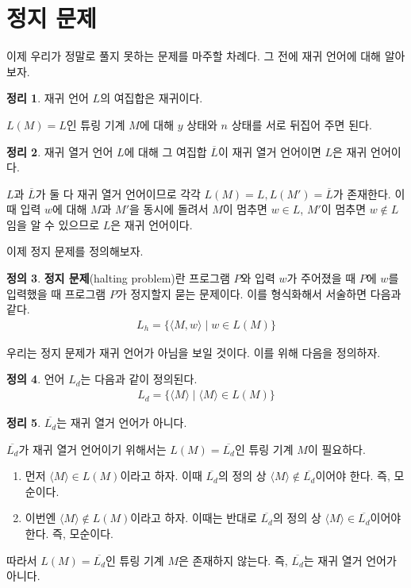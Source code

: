 \documentclass[b5paper, 11pt]{book}
\theoremstyle{definition}
\newtheorem{defn}{정의}[chapter]
\newtheorem{thm}[defn]{정리}
\newenvironment{pf*}{\pushQED{\qed}\pf}
{\popQED\endpf}
\begin{document}
\section{정지 문제}
이제 우리가 정말로 풀지 못하는 문제를 마주할 차례다. 그 전에 재귀 언어에 대해 알아보자.
\begin{thm}
    재귀 언어 $L$의 여집합은 재귀이다.
\end{thm}
\begin{pf*}
    $L(M) = L$인 튜링 기계 $M$에 대해 $y$ 상태와 $n$ 상태를 서로 뒤집어 주면 된다.
\end{pf*}
\begin{thm}
    재귀 열거 언어 $L$에 대해 그 여집합 $\overline{L}$이 재귀 열거 언어이면 $L$은 재귀 언어이다.
\end{thm}
\begin{pf*}
    $L$과 $\overline{L}$가 둘 다 재귀 열거 언어이므로 각각 $L(M) = L, L(M') = \overline{L}$가 존재한다. 이때 입력 $w$에
    대해 $M$과 $M'$을 동시에 돌려서 $M$이 멈추면 $w \in L$, $M'$이 멈추면 $w \notin L$임을 알 수 있으므로
    $L$은 재귀 언어이다. 
\end{pf*}
이제 정지 문제를 정의해보자. 
\begin{defn}
    \textbf{정지 문제}(halting problem)란 프로그램 $P$와 입력 $w$가 주어졌을 때 $P$에 $w$를 입력했을
    때 프로그램 $P$가 정지할지 묻는 문제이다. 이를 형식화해서 서술하면 다음과 같다.
    \begin{align*}
        L_h = \{ \langle M, w \rangle \;\vert\; w \in L(M) \}
    \end{align*}
\end{defn}
우리는 정지 문제가 재귀 언어가 아님을 보일 것이다. 이를 위해 다음을 정의하자.
\begin{defn}
    언어 $L_d$는 다음과 같이 정의된다.
    \begin{align*}
        L_d = \{ \langle M \rangle \;\vert\; \langle M \rangle \in L(M) \}
    \end{align*}
\end{defn}
\begin{thm}\label{Ldc not re}
    $\overline{L_d}$는 재귀 열거 언어가 아니다. 
\end{thm}
\begin{pf*}
    $\overline{L_d}$가 재귀 열거 언어이기 위해서는 $L(M) = \overline{L_d}$인 튜링 기계 $M$이 필요하다.
    \begin{enumerate}
        \item  먼저 $\langle M \rangle \in L(M)$이라고 하자. 이때 $\overline{L_d}$의 정의 상 
        $\langle M \rangle \notin \overline{L_d}$이어야
        한다. 즉, 모순이다.
        \item  이번엔 $\langle M \rangle \notin L(M)$이라고 하자. 이때는 반대로 
        $\overline{L_d}$의 정의 상 $\langle M \rangle \in \overline{L_d}$이어야
        한다. 즉, 모순이다. 
    \end{enumerate}
    따라서 $L(M) = \overline{L_d}$인 튜링 기계 $M$은 존재하지 않는다. 즉, $\overline{L_d}$는 재귀 열거 언어가 아니다.
\end{pf*}
\end{document}
